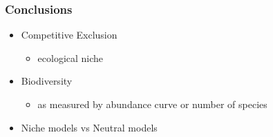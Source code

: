 \documentclass{beamer}
\begin{document}
\begin{frame}
\frametitle{Conclusions}
\begin{itemize}
\item Competitive Exclusion
\begin{itemize}
\item ecological niche
\end{itemize}
\pause
\item Biodiversity
\begin{itemize}
\item as measured by abundance curve or number of species
\end{itemize}
\pause
\item Niche models vs Neutral models
\end{itemize}
\end{frame}
\end{document}
